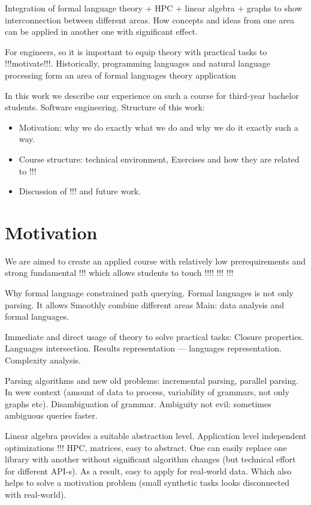 \documentclass[sigconf]{acmart}
\begin{document}
Integration of formal language theory + HPC + linear algebra + graphs to show interconnection between different areas. How concepts and ideas from one area can be applied in another one with significant effect. 

For engineers, so it is important to equip theory with practical tasks to !!!motivate!!!. Historically, programming languages and natural language processing form an area of formal languages theory application 

In this work we describe our experience on such a course for third-year bachelor students. Software engineering. Structure of this work:
\begin{itemize}
  \item Motivation: why we do exactly what we do and why we do it exactly such a way. 
  \item Course structure: technical environment, Exercises and how they are related to !!!
  \item Discussion of !!! and future work.
\end{itemize}  

\section{Motivation}

We are aimed to create an applied course with relatively low prerequirements and strong fundamental !!! which allows students to touch !!!! !!! !!! 

 Why formal language constrained path querying. Formal languages is not only parsing. It allows Smoothly combine different areas Main: data analysis and formal languages.

Immediate and direct usage of theory to solve practical tasks: Closure properties. Languages intersection.  Results representation --- languages representation. Complexity analysis.

Parsing algorithms and new old problems: incremental parsing, parallel parsing. In wew context (amount of data to process, variability of grammars, not only graphs etc). Disambiguation of grammar.  Ambiguity not evil: sometimes ambiguous queries faster.

Linear algebra provides a suitable abstraction level. Application level independent optimizations !!! HPC, matrices, easy to abstract. One can easily replace one library with another without significant algorithm changes (but technical effort for different API-s). As a result, easy to apply for real-world data. Which also helps to solve a motivation problem (small synthetic tasks looks disconnected with real-world).
\end{document}
